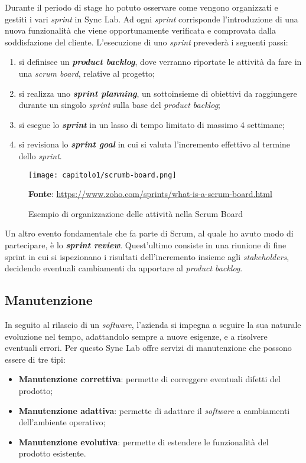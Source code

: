 Durante il periodo di stage ho potuto osservare come vengono organizzati e gestiti i vari \textit{sprint} in Sync Lab. Ad ogni \textit{sprint} corrisponde l'introduzione di una nuova funzionalità che viene opportunamente verificata e comprovata dalla soddisfazione del cliente. L'esecuzione di uno \textit{sprint} prevederà i seguenti passi:
\begin{enumerate}
  \item si definisce un \textbf{\textit{product backlog}}, dove verranno riportate le attività da fare in una \textit{scrum board}, relative al progetto;
  \item si realizza uno \textbf{\textit{sprint planning}}, un sottoinsieme di obiettivi da raggiungere durante un singolo \textit{sprint} sulla base del \textit{product backlog};
  \item si esegue lo \textbf{\textit{sprint}} in un lasso di tempo limitato di massimo 4 settimane;
  \item si revisiona lo \textbf{\textit{sprint goal}} in cui si valuta l'incremento effettivo al termine dello \textit{sprint}.
\end{enumerate}


\begin{figure}[h!]
  \centering
  \texttt{[image: capitolo1/scrumb-board.png]}
  \caption{Esempio di organizzazione delle attività nella Scrum Board}
  \textbf{Fonte}: \href{https://www.zoho.com/sprints/what-is-a-scrum-board.html}{https://www.zoho.com/sprints/what-is-a-scrum-board.html}
\end{figure}

Un altro evento fondamentale che fa parte di Scrum, al quale ho avuto modo di partecipare, è lo \textbf{\textit{sprint review}}. Quest'ultimo consiste in una riunione di fine sprint in cui si ispezionano i risultati dell'incremento insieme agli \textit{stakeholders}, decidendo eventuali cambiamenti da apportare al \textit{product backlog}. \\

\subsection{Manutenzione}
In seguito al rilascio di un \textit{software}, l'azienda si impegna a seguire la sua naturale evoluzione nel tempo, adattandolo sempre a nuove esigenze, e a risolvere eventuali errori. Per questo Sync Lab offre servizi di manutenzione che possono essere di tre tipi:
\begin{itemize}
  \item \textbf{Manutenzione correttiva}: permette di correggere eventuali difetti del prodotto;
  \item \textbf{Manutenzione adattiva}: permette di adattare il \textit{software} a cambiamenti dell'ambiente operativo;
  \item \textbf{Manutenzione evolutiva}: permette di estendere le funzionalità del prodotto esistente.
\end{itemize}